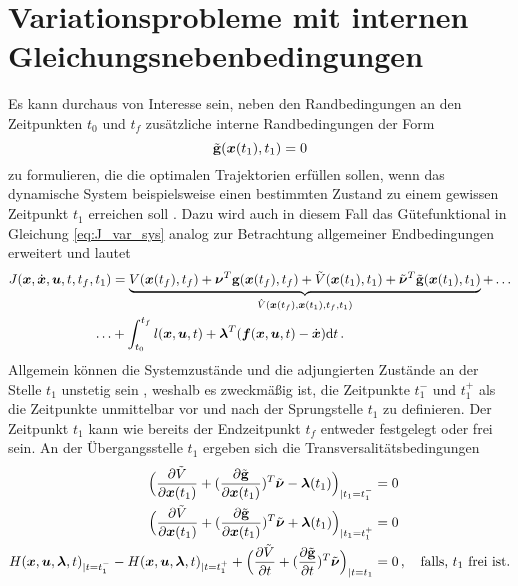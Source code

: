 \section{Variationsprobleme mit internen Gleichungsnebenbedingungen}\label{sec:InterneGNB}
Es kann durchaus von Interesse sein, neben den Randbedingungen an den Zeitpunkten $t_0$ und $t_f$ zusätzliche interne Randbedingungen der Form
\begin{equation}
	\tilde{\mathbf{g}}(\boldsymbol{x}(t_1),t_1) = 0 \label{eq:NBt1}
\end{equation} zu formulieren, die die optimalen Trajektorien erfüllen sollen, wenn das dynamische System beispielsweise einen bestimmten Zustand zu einem gewissen Zeitpunkt $t_1$ erreichen soll \cite{Papageorgiou.2012}. Dazu wird auch in diesem Fall das Gütefunktional in Gleichung \eqref{eq:J_var_sys} analog zur Betrachtung allgemeiner Endbedingungen erweitert und lautet 
\begin{equation}
\begin{split}
J(\boldsymbol{x},\dot{\boldsymbol{x}},\boldsymbol{u},t,t_f,t_1) &= \underbrace{V(\boldsymbol{x}(t_f),t_f) + \boldsymbol{\nu}^T\mathbf{g}(\boldsymbol{x}(t_f),t_f) + \tilde{V}(\boldsymbol{x}(t_1),t_1) + \tilde{\boldsymbol{\nu}}^T\tilde{\mathbf{g}}(\boldsymbol{x}(t_1),t_1)}_{\hat{V}(\boldsymbol{x}(t_f),\boldsymbol{x}(t_1),t_f,t_1)} + \dots \\
\dots&+\int_{t_0}^{t_f}l(\boldsymbol{x},\boldsymbol{u},t) + \boldsymbol{\lambda}^T(\boldsymbol{f}(\boldsymbol{x},\boldsymbol{u},t) - \dot{\boldsymbol{x}})\textrm{d}{t}\,. \label{eq:J_var_sys_t1}
\end{split}
\end{equation}
Allgemein können die Systemzustände und die adjungierten Zustände an der Stelle $t_1$ unstetig sein \cite{Gerdts.2010}, weshalb es zweckmäßig ist, die Zeitpunkte $t_1^-$ und $t_1^+$ als die Zeitpunkte unmittelbar vor und nach der Sprungstelle $t_1$ zu definieren. Der Zeitpunkt $t_1$ kann wie bereits der Endzeitpunkt $t_f$ entweder festgelegt oder frei sein. An der Übergangsstelle $t_1$ ergeben sich die Transversalitätsbedingungen \cite{Gerdts.2010}
\begin{align}
\Big(\frac{\partial \tilde{V}}{\partial \boldsymbol{x}(t_1)} + (\frac{\partial \tilde{\mathbf{g}}}{\partial \boldsymbol{x}(t_1)})^T\tilde{\boldsymbol{\nu}} - \boldsymbol{\lambda}(t_1)\Big)_{|t_1=t_1^-} &= 0 \label{eq:Sprungbedingung1}\\
\Big(\frac{\partial \tilde{V}}{\partial \boldsymbol{x}(t_1)} + (\frac{\partial \tilde{\mathbf{g}}}{\partial \boldsymbol{x}(t_1)})^T\tilde{\boldsymbol{\nu}} + \boldsymbol{\lambda}(t_1)\Big)_{|t_1=t_1^+} &= 0 \label{eq:Sprungbedingung2}\\
H(\boldsymbol{x},\boldsymbol{u},\boldsymbol{\lambda},t)_{|t=t_1^-} - H(\boldsymbol{x},\boldsymbol{u},\boldsymbol{\lambda},t)_{|t=t_1^+} + \Big(\frac{\partial \tilde{V}}{\partial t}+(\frac{\partial \tilde{\mathbf{g}}}{\partial t})^T\tilde{\boldsymbol{\nu}}\Big)_{|t=t_1}&= 0\,,\quad \textrm{falls, $t_1$ frei ist.}\label{eq:Transversalität_t1}
\end{align}
